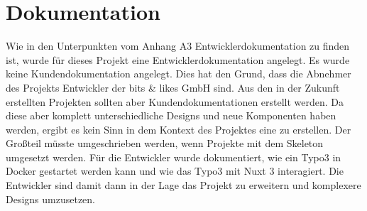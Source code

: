 \section{Dokumentation}
\label{sec:Dokumentation}

Wie in den Unterpunkten vom Anhang A3 Entwicklerdokumentation zu finden ist, wurde für dieses Projekt eine Entwicklerdokumentation angelegt. Es wurde keine Kundendokumentation angelegt. Dies hat den Grund, dass die Abnehmer des Projekts Entwickler der bits \& likes GmbH sind. Aus den in der Zukunft erstellten Projekten sollten aber Kundendokumentationen erstellt werden. Da diese aber komplett unterschiedliche Designs und neue Komponenten haben werden, ergibt es kein Sinn in dem Kontext des Projektes eine zu erstellen. Der Großteil müsste umgeschrieben werden, wenn Projekte mit dem Skeleton umgesetzt werden. Für die Entwickler wurde dokumentiert, wie ein Typo3 in Docker gestartet werden kann und wie das Typo3 mit Nuxt 3 interagiert. Die Entwickler sind damit dann in der Lage das Projekt zu erweitern und komplexere Designs umzusetzen.